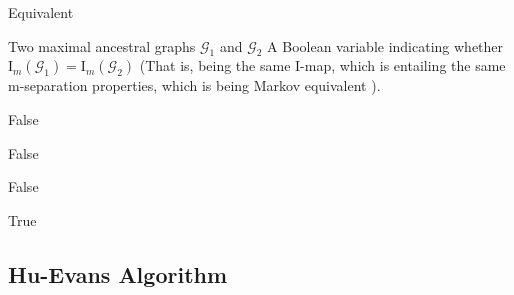 \documentclass[a4paper]{article}
\begin{document}
\begin{algorithm}
\caption{Equivalent}
\label{alg:asr-equiv}
\begin{algorithmic}[1]
	\renewcommand{\algorithmicrequire}{\textbf{Input:}}
	\renewcommand{\algorithmicensure}{\textbf{Output:}}
	\Require Two maximal ancestral graphs $\mathcal{G}_1$ and $\mathcal{G}_2$
	\Ensure A Boolean variable indicating whether $\text{I}_m(\mathcal{G}_1) = \text{I}_m(\mathcal{G}_2)$ (That is, being the same I-map, which is entailing the same m-separation properties, which is being Markov equivalent \cite{pearl2009}).
	
	\Return False
	\EndIf
	
	\Return False
	\EndIf
	
	\Return False
	\EndIf
	
	\Return True
\end{algorithmic}
\end{algorithm}

\newpage

\subsection{Hu-Evans Algorithm}
\end{document}
